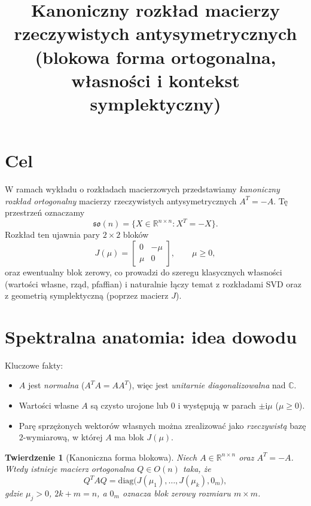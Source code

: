 \documentclass[12pt]{article}
\title{Kanoniczny rozkład macierzy rzeczywistych antysymetrycznych\\[2mm]
{\large (blokowa forma ortogonalna, własności i kontekst symplektyczny)}}
\author{}
\date{}
\theoremstyle{plain}
\newtheorem{theorem}{Twierdzenie}
\theoremstyle{remark}
\newcommand{\R}{\mathbb{R}}
\newcommand{\C}{\mathbb{C}}
\newcommand{\ii}{\mathrm{i}}
\begin{document}
\maketitle

\section*{Cel}
W ramach wykładu o rozkładach macierzowych przedstawiamy \emph{kanoniczny rozkład ortogonalny}
macierzy rzeczywistych antysymetrycznych $A^T=-A$.  Tę przestrzeń oznaczamy
\[
\mathfrak{so}(n)=\{X\in\R^{n\times n} : X^T=-X\}.
\]
Rozkład ten ujawnia pary $2\times2$ bloków
\[
J(\mu)=\begin{bmatrix}0&-\mu\\ \mu&0\end{bmatrix},\qquad \mu\ge 0,
\]
oraz ewentualny blok zerowy, co prowadzi do szeregu klasycznych własności
(wartości własne, rząd, pfaffian) i naturalnie łączy temat z rozkładami SVD
oraz z geometrią symplektyczną (poprzez macierz $J$).

\section{Spektralna anatomia: idea dowodu}
Kluczowe fakty:
\begin{itemize}[itemsep=2pt]
  \item $A$ jest \emph{normalna} ($A^TA=AA^T$), więc jest \emph{unitarnie diagonalizowalna} nad $\C$.
  \item Wartości własne $A$ są czysto urojone lub $0$ i występują w parach $\pm \ii \mu$ ($\mu\ge 0$).
  \item Parę sprzężonych wektorów własnych można zrealizować jako \emph{rzeczywistą} bazę $2$-wymiarową,
        w której $A$ ma blok $J(\mu)$.
\end{itemize}

\begin{theorem}[Kanoniczna forma blokowa]
Niech $A\in\R^{n\times n}$ oraz $A^T=-A$. Wtedy istnieje macierz ortogonalna $Q\in O(n)$
taka, że
\[
Q^TAQ=\mathrm{diag}\big(J(\mu_1),\dots,J(\mu_k),0_{m}\big),
\]
gdzie $\mu_j>0$, $2k+m=n$, a $0_m$ oznacza blok zerowy rozmiaru $m\times m$.
\end{theorem}
\end{document}
